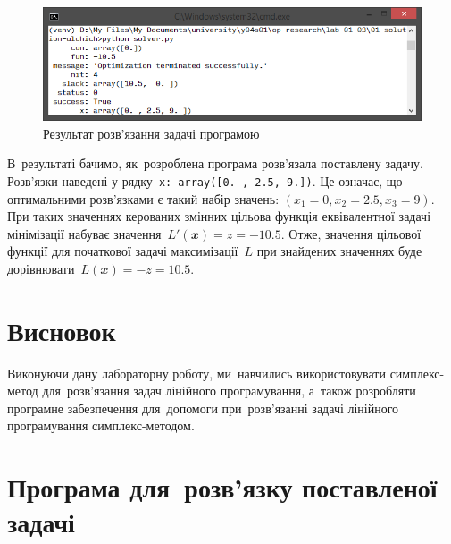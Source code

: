 \documentclass[
  a4paper,
  oneside,
  BCOR = 10mm,
  DIV = 12,
  12pt,
  headings = normal,
]{scrartcl}
\newcommand{\vect}[1]{\mathbfit{#1}}
\begin{document}
    \begin{figure}[!htbp]
      \centering
      \includegraphics[width = \columnwidth]{./assets/p01.png}
      \caption{Результат розв'язання задачі програмою}
      \label{fig:01-solver-res}
    \end{figure}

    В~результаті бачимо, як~розроблена програма розв'язала поставлену задачу. Розв'язки наведені у рядку~\verb|x: array([0. , 2.5, 9.])|. Це означає, що оптимальними розв'язками є такий набір значень: $(x_{1} = 0, x_{2} = \num{2.5}, x_{3} = 9)$. При таких значеннях керованих змінних цільова функція еквівалентної задачі мінімізації набуває значення~$L'(\vect{x}) = z = \num{-10.5}$. Отже, значення цільової функції для початкової задачі максимізації~$L$ при знайдених значеннях буде дорівнювати~$L(\vect{x}) = -z = \num{10.5}$.

  \section{Висновок}
    Виконуючи дану лабораторну роботу, ми~навчились використовувати симплекс-метод для~розв'язання задач лінійного програмування, а~також розробляти програмне забезпечення для~допомоги при~розв'язанні задачі лінійного програмування симплекс-методом.

  \appendix
  \section{Програма для~розв'язку поставленої задачі}

\end{document}
